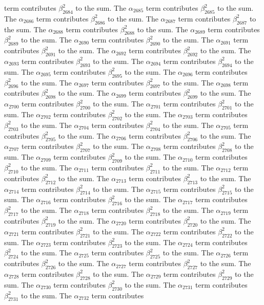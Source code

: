 \begin{lemma}
term contributes $\beta_{2684}^{2}$ to the sum. The $\alpha_{2685}$ term contributes $\beta_{2685}^{2}$ to the sum. The $\alpha_{2686}$ term contributes $\beta_{2686}^{2}$ to the sum. The $\alpha_{2687}$ term contributes $\beta_{2687}^{2}$ to the sum. The $\alpha_{2688}$ term contributes $\beta_{2688}^{2}$ to the sum. The $\alpha_{2689}$ term contributes $\beta_{2689}^{2}$ to the sum. The $\alpha_{2690}$ term contributes $\beta_{2690}^{2}$ to the sum. The $\alpha_{2691}$ term contributes $\beta_{2691}^{2}$ to the sum. The $\alpha_{2692}$ term contributes $\beta_{2692}^{2}$ to the sum. The $\alpha_{2693}$ term contributes $\beta_{2693}^{2}$ to the sum. The $\alpha_{2694}$ term contributes $\beta_{2694}^{2}$ to the sum. The $\alpha_{2695}$ term contributes $\beta_{2695}^{2}$ to the sum. The $\alpha_{2696}$ term contributes $\beta_{2696}^{2}$ to the sum. The $\alpha_{2697}$ term contributes $\beta_{2697}^{2}$ to the sum. The $\alpha_{2698}$ term contributes $\beta_{2698}^{2}$ to the sum. The $\alpha_{2699}$ term contributes $\beta_{2699}^{2}$ to the sum. The $\alpha_{2700}$ term contributes $\beta_{2700}^{2}$ to the sum. The $\alpha_{2701}$ term contributes $\beta_{2701}^{2}$ to the sum. The $\alpha_{2702}$ term contributes $\beta_{2702}^{2}$ to the sum. The $\alpha_{2703}$ term contributes $\beta_{2703}^{2}$ to the sum. The $\alpha_{2704}$ term contributes $\beta_{2704}^{2}$ to the sum. The $\alpha_{2705}$ term contributes $\beta_{2705}^{2}$ to the sum. The $\alpha_{2706}$ term contributes $\beta_{2706}^{2}$ to the sum. The $\alpha_{2707}$ term contributes $\beta_{2707}^{2}$ to the sum. The $\alpha_{2708}$ term contributes $\beta_{2708}^{2}$ to the sum. The $\alpha_{2709}$ term contributes $\beta_{2709}^{2}$ to the sum. The $\alpha_{2710}$ term contributes $\beta_{2710}^{2}$ to the sum. The $\alpha_{2711}$ term contributes $\beta_{2711}^{2}$ to the sum. The $\alpha_{2712}$ term contributes $\beta_{2712}^{2}$ to the sum. The $\alpha_{2713}$ term contributes $\beta_{2713}^{2}$ to the sum. The $\alpha_{2714}$ term contributes $\beta_{2714}^{2}$ to the sum. The $\alpha_{2715}$ term contributes $\beta_{2715}^{2}$ to the sum. The $\alpha_{2716}$ term contributes $\beta_{2716}^{2}$ to the sum. The $\alpha_{2717}$ term contributes $\beta_{2717}^{2}$ to the sum. The $\alpha_{2718}$ term contributes $\beta_{2718}^{2}$ to the sum. The $\alpha_{2719}$ term contributes $\beta_{2719}^{2}$ to the sum. The $\alpha_{2720}$ term contributes $\beta_{2720}^{2}$ to the sum. The $\alpha_{2721}$ term contributes $\beta_{2721}^{2}$ to the sum. The $\alpha_{2722}$ term contributes $\beta_{2722}^{2}$ to the sum. The $\alpha_{2723}$ term contributes $\beta_{2723}^{2}$ to the sum. The $\alpha_{2724}$ term contributes $\beta_{2724}^{2}$ to the sum. The $\alpha_{2725}$ term contributes $\beta_{2725}^{2}$ to the sum. The $\alpha_{2726}$ term contributes $\beta_{2726}^{2}$ to the sum. The $\alpha_{2727}$ term contributes $\beta_{2727}^{2}$ to the sum. The $\alpha_{2728}$ term contributes $\beta_{2728}^{2}$ to the sum. The $\alpha_{2729}$ term contributes $\beta_{2729}^{2}$ to the sum. The $\alpha_{2730}$ term contributes $\beta_{2730}^{2}$ to the sum. The $\alpha_{2731}$ term contributes $\beta_{2731}^{2}$ to the sum. The $\alpha_{2732}$ term contributes 
\end{lemma}
